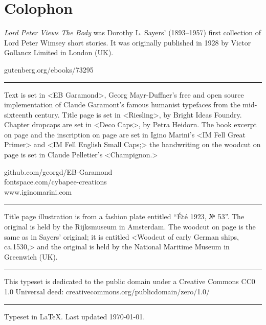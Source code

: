 \documentclass[
a5paper,
]{scrbook} %
\begin{document}
\chapter*{Colophon}
\begin{center}
\begin{minipage}{\textwidth}
\textit{Lord Peter Views The Body} was Dorothy L. Sayers' (1893--1957) first collection of Lord Peter Wimsey short stories. It was originally published in 1928 by Victor Gollancz Limited in London (UK).
\end{minipage}
\vfill
gutenberg.org/ebooks/73295
\vfill
\rule{0.5\textwidth}{.4pt}
\vfill

\begin{minipage}{\textwidth}
Text is set in <EB Garamond>, Georg Mayr-Duffner's free and open source implementation of Claude Garamont’s famous humanist typefaces from the mid-sixteenth century. Title page is set in <Riesling>, by Bright Ideas Foundry. Chapter dropcaps are set in <Deco Caps>, by Petra Heidorn. The book excerpt on page \pageref{dragonbook} and the inscription on page \pageref{post} are set in Igino Marini's <IM Fell Great Primer> and <IM Fell English Small Caps;> the handwriting on the woodcut on page \pageref{treasure} is set in Claude Pelletier's <Champignon.> 
\end{minipage}
\vfill
github.com/georgd/EB-Garamond\\fontspace.com/cybapee-creations\\www.iginomarini.com
\vfill
\rule{0.5\textwidth}{.4pt}
\vfill
\begin{minipage}{\textwidth}
Title page illustration is from a fashion plate entitled \foreignquote{french}{Été 1923, № 53}. The original is held by the Rijksmuseum in Amsterdam.  The woodcut on page \pageref{treasure} is the same as in Sayers' original; it is entitled <Woodcut of early German ships, ca.1530,> and the original is held by the National Maritime Museum in Greenwich (UK).
\end{minipage}
\vfill
\rule{0.5\textwidth}{.4pt}
\vfill

\begin{minipage}{\textwidth}
This typeset is dedicated to the public domain under a Creative Commons CC0 1.0 Universal deed: creativecommons.org/publicdomain/zero/1.0/
\end{minipage}
\vfill
\rule{0.5\textwidth}{.4pt}
\vfill
Typeset in \LaTeX{}. Last updated \today.
\end{center}
\thispagestyle{empty}
\end{document}

